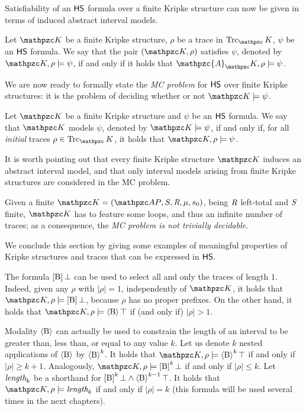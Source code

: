 Satisfiability of an $\text{\sffamily HS}$ formula over a finite Kripke structure can now be given in terms of induced abstract interval models.
\begin{definition}\label{def:satkripke}
Let $\Ku$ be a finite Kripke structure, $\rho$ be a trace in $\Trk_\Ku$,
$\psi$ be an $\text{\sffamily HS}$ formula. We say that the pair $(\Ku,\rho)$ satisfies $\psi$, denoted by $\Ku,\rho\models \psi$, if and only if it holds that $\mathpzc{A}_\Ku,\rho\models \psi$.
\end{definition}
We are now ready to formally state the \emph{MC problem} for $\text{\sffamily HS}$ over finite Kripke structures: it is the problem of deciding whether or not  $\Ku\models \psi$.
\begin{definition}\label{def:MCkripke}
Let $\Ku$ be a finite Kripke structure and $\psi$ be an $\text{\sffamily HS}$ formula. We say that
$\Ku$ models $\psi$, denoted by $\Ku\models \psi$, if and only if, 
for all \emph{initial} traces $\rho\in\Trk_\Ku$, it holds that $\Ku,\rho\models \psi$.
\end{definition}
It is worth pointing out that every finite Kripke structure $\Ku$ induces an abstract interval model, and that only interval models arising from finite Kripke structures are considered in the MC problem. 

Given a finite $\Ku=\KuDef$, being $\textit{R}$ left-total and $S$ finite,
$\Ku$ has to feature some loops, and thus
an infinite number of traces; as a consequence, 
the \emph{MC problem is not trivially decidable}.

We conclude this section by giving some examples of meaningful properties of Kripke structures and traces that can be expressed in $\text{\sffamily HS}$. 

\begin{example}\label{example:length}
The formula $\operatorname{\mathopen[ B \mathclose]}\bot$ can be used to select all and only the traces of length $1$. Indeed, given any $\rho$ with $|\rho|=1$, independently of $\Ku$, it holds that $\Ku,\rho\models \hsBu\bot$, because $\rho$ has no proper prefixes. On the other hand, it holds that $\Ku,\rho\models \hsB\top$ if (and only if) $|\rho| > 1$.

Modality $\operatorname{\langle B\rangle}$ can actually be used to constrain the length of an interval to be greater than, less than,  or equal to any value $k$. Let us denote $k$ nested applications of $\operatorname{\langle B\rangle}$ by $\operatorname{\langle B\rangle}^k$. It holds that 
$\Ku,\rho\models \hsB^k\top$ if and only if $|\rho|\geq k+1$. Analogously, $\Ku,\rho\models \hsBu^k\bot$ if and only if $|\rho|\leq k$. 
Let $\textit{length}_k$ be a shorthand for $\operatorname{\mathopen[ B \mathclose]}^{k}\bot \wedge \operatorname{\langle B\rangle}^{k-1}\top$. It holds that $\Ku,\rho\models \Length_k$ if and only if $|\rho|=k$ (this formula will be used several times in the next chapters).
\end{example}

